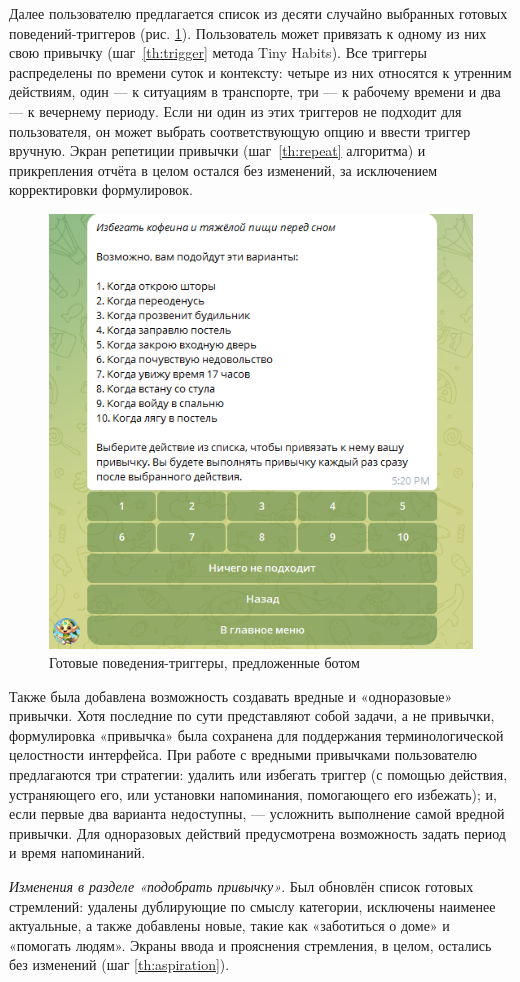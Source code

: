 \documentclass[pdflatex,sn-mathphys-num]{sn-jnl}%
\theoremstyle{thmstyleone}%
\theoremstyle{thmstyletwo}%
\theoremstyle{thmstylethree}%
\begin{document}
Далее пользователю предлагается список из десяти случайно выбранных готовых поведений-триггеров (рис. \ref{fig:bot_premade_triggers}). Пользователь может привязать к одному из них свою привычку (шаг~\ref{th:trigger} метода Tiny Habits). Все триггеры распределены по времени суток и контексту: четыре из них относятся к утренним действиям, один — к ситуациям в транспорте, три — к рабочему времени и два — к вечернему периоду. Если ни один из этих триггеров не подходит для пользователя, он может выбрать соответствующую опцию и ввести триггер вручную. Экран репетиции привычки (шаг~\ref{th:repeat} алгоритма) и прикрепления отчёта в целом остался без изменений, за исключением корректировки формулировок.

\begin{figure}
    \centering
    \includegraphics[width=0.6\linewidth]{figures/Bot/bot_premade_triggers.png}
    \caption{Готовые поведения-триггеры, предложенные ботом}
    \label{fig:bot_premade_triggers}
\end{figure}

Также была добавлена возможность создавать вредные и «одноразовые» привычки. Хотя последние по сути представляют собой задачи, а не привычки, формулировка «привычка» была сохранена для поддержания терминологической целостности интерфейса. При работе с вредными привычками пользователю предлагаются три стратегии: удалить или избегать триггер (с помощью действия, устраняющего его, или установки напоминания, помогающего его избежать); и, если первые два варианта недоступны, — усложнить выполнение самой вредной привычки. Для одноразовых действий предусмотрена возможность задать период и время напоминаний.

\textit{Изменения в разделе «подобрать привычку»}. Был обновлён список готовых стремлений: удалены дублирующие по смыслу категории, исключены наименее актуальные, а также добавлены новые, такие как «заботиться о доме» и «помогать людям». Экраны ввода и прояснения стремления, в целом, остались без изменений (шаг \ref{th:aspiration}).
\end{document}
